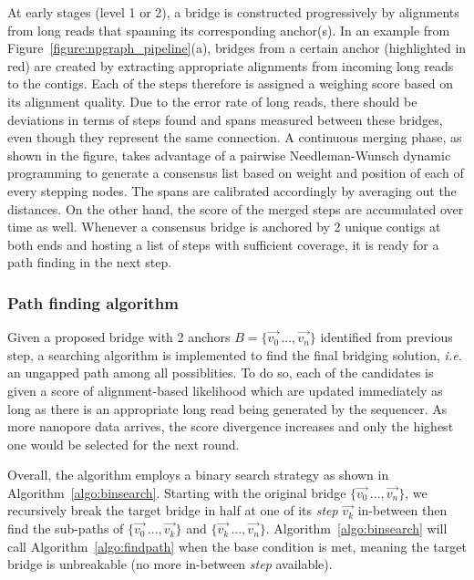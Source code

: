 \documentclass[10pt,letterpaper]{article}
\newcommand{\IE}{\emph{i.e.}}
\begin{document}
At early stages (level 1 or 2), a bridge is constructed progressively by alignments from long reads that spanning its corresponding anchor(s).
In an example from Figure~\ref{figure:npgraph_pipeline}(a), bridges from a certain anchor (highlighted in red) are created by extracting appropriate alignments from incoming long reads to the contigs. Each of the steps therefore is assigned a weighing score based on its alignment quality.
Due to the error rate of long reads, there should be deviations in terms of steps found and spans measured between these bridges, even though they represent the same connection.
A continuous merging phase, as shown in the figure, takes advantage of a pairwise Needleman-Wunsch dynamic programming to generate a consensus list based on weight and position of each of every stepping nodes. The spans are calibrated accordingly by averaging out the distances. On the other hand, the score of the merged steps are accumulated over time as well.
Whenever a consensus bridge is anchored by 2 unique contigs at both ends and hosting a list of steps with sufficient coverage, it is ready for a path finding in the next step.


\subsubsection*{Path finding algorithm}
Given a proposed bridge with 2 anchors $B=\lbrace\overrightarrow{v_0}\,..., \overrightarrow{v_n}\rbrace$ identified from previous step, a searching algorithm is implemented to find the final bridging solution, \IE{} an ungapped path among all possiblities. To do so, each of the candidates is given a score of alignment-based likelihood which are updated immediately as long as there is an appropriate long read being generated by the sequencer. As more nanopore data arrives, the score divergence increases and only the highest one would be selected for the next round.

Overall, the algorithm employs a binary search strategy as shown in Algorithm~\ref{algo:binsearch}. Starting with the original bridge $\lbrace\overrightarrow{v_0}\,..., \overrightarrow{v_n}\rbrace$, we recursively break the target bridge in half at one of its \emph{step} $\overrightarrow{v_k}$ in-between then find the sub-paths of $\lbrace\overrightarrow{v_0}\,..., \overrightarrow{v_k}\rbrace$ and $\lbrace\overrightarrow{v_k}\,..., \overrightarrow{v_n}\rbrace$. Algorithm~\ref{algo:binsearch} will call Algorithm~\ref{algo:findpath} when the base condition is met, meaning the target bridge is unbreakable (no more in-between \emph{step} available).
\end{document}
